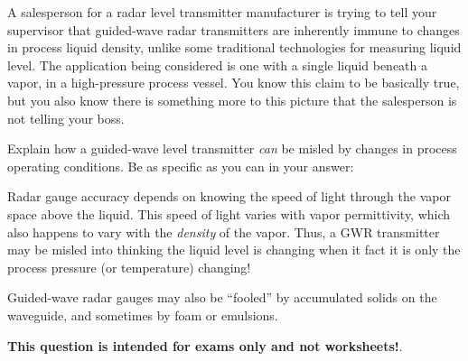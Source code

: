 

A salesperson for a radar level transmitter manufacturer is trying to tell your supervisor that guided-wave radar transmitters are inherently immune to changes in process liquid density, unlike some traditional technologies for measuring liquid level.  The application being considered is one with a single liquid beneath a vapor, in a high-pressure process vessel.  You know this claim to be basically true, but you also know there is something more to this picture that the salesperson is not telling your boss.

\vskip 10pt

Explain how a guided-wave level transmitter {\it can} be misled by changes in process operating conditions.  Be as specific as you can in your answer:

\vskip 50pt







Radar gauge accuracy depends on knowing the speed of light through the vapor space above the liquid.  This speed of light varies with vapor permittivity, which also happens to vary with the {\it density} of the vapor.  Thus, a GWR transmitter may be misled into thinking the liquid level is changing when it fact it is only the process pressure (or temperature) changing!

Guided-wave radar gauges may also be ``fooled'' by accumulated solids on the waveguide, and sometimes by foam or emulsions.







{\bf This question is intended for exams only and not worksheets!}.


